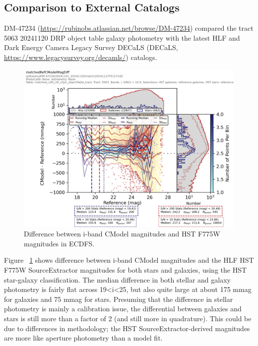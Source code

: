 \subsection{Comparison to External Catalogs}
\label{subsec:galaxy_photometry_external_catalogs}

DM-47234 (\url{https://rubinobs.atlassian.net/browse/DM-47234}) compared the tract 5063 20241120 DRP object table galaxy photometry with the latest HLF and Dark Energy Camera Legacy Survey DECaLS (DECaLS, \url{https://www.legacysurvey.org/decamls/}) catalogs.

\begin{figure}
  \includegraphics{galaxy_photometry/cdfs_i_vs_HST_F775W.png}
  \caption{Difference between i-band CModel magnitudes and HST F775W magnitudes in ECDFS.}
  \label{fig:cdfs_i_vs_HST_F775W}
\end{figure}

Figure ~\ref{fig:cdfs_i_vs_HST_F775W} shows difference between i-band CModel magnitudes and the HLF HST F775W SourceExtractor magnitudes for both stars and galaxies, using the HST star-galaxy classification.
The median difference in both stellar and galaxy photometry is fairly flat across 19<i<25, but also quite large at about 175 mmag for galaxies and 75 mmag for stars.
Presuming that the difference in stellar photometry is mainly a calibration issue, the differential between galaxies and stars is still more than a factor of 2 (and still more in quadrature).
This could be due to differences in methodology; the HST SourceExtractor-derived magnitudes are more like aperture photometry than a model fit.

